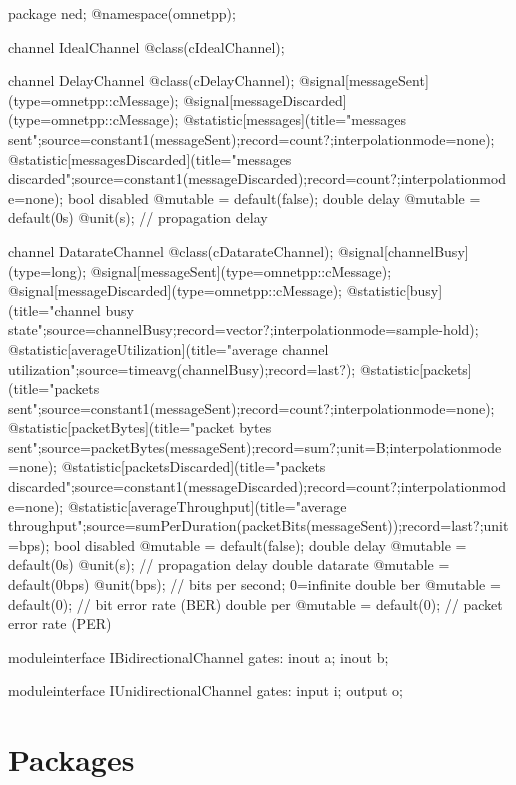 \begin{ned}

package ned;
@namespace(omnetpp);

channel IdealChannel
{
    @class(cIdealChannel);
}

channel DelayChannel
{
    @class(cDelayChannel);
    @signal[messageSent](type=omnetpp::cMessage);
    @signal[messageDiscarded](type=omnetpp::cMessage);
    @statistic[messages](title="messages sent";source=constant1(messageSent);record=count?;interpolationmode=none);
    @statistic[messagesDiscarded](title="messages discarded";source=constant1(messageDiscarded);record=count?;interpolationmode=none);
    bool disabled @mutable = default(false);
    double delay @mutable = default(0s) @unit(s); // propagation delay
}

channel DatarateChannel
{
    @class(cDatarateChannel);
    @signal[channelBusy](type=long);
    @signal[messageSent](type=omnetpp::cMessage);
    @signal[messageDiscarded](type=omnetpp::cMessage);
    @statistic[busy](title="channel busy state";source=channelBusy;record=vector?;interpolationmode=sample-hold);
    @statistic[averageUtilization](title="average channel utilization";source=timeavg(channelBusy);record=last?);
    @statistic[packets](title="packets sent";source=constant1(messageSent);record=count?;interpolationmode=none);
    @statistic[packetBytes](title="packet bytes sent";source=packetBytes(messageSent);record=sum?;unit=B;interpolationmode=none);
    @statistic[packetsDiscarded](title="packets discarded";source=constant1(messageDiscarded);record=count?;interpolationmode=none);
    @statistic[averageThroughput](title="average throughput";source=sumPerDuration(packetBits(messageSent));record=last?;unit=bps);
    bool disabled @mutable = default(false);
    double delay @mutable = default(0s) @unit(s); // propagation delay
    double datarate @mutable = default(0bps) @unit(bps); // bits per second; 0=infinite
    double ber @mutable = default(0); // bit error rate (BER)
    double per @mutable = default(0); // packet error rate (PER)
}

moduleinterface IBidirectionalChannel
{
    gates:
        inout a;
        inout b;
}

moduleinterface IUnidirectionalChannel
{
    gates:
        input i;
        output o;
}
\end{ned}


\section{Packages}
\label{sec:ned-ref:packages}

